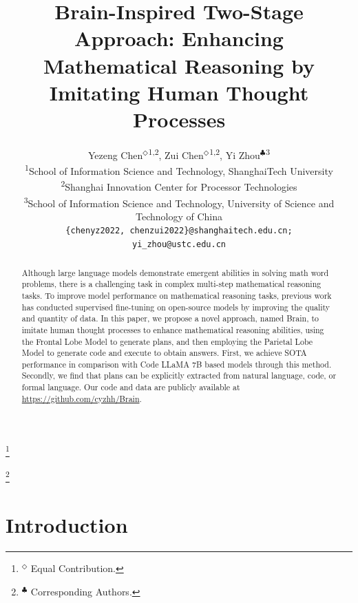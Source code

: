 \documentclass[11pt]{article}
\title{Brain-Inspired Two-Stage Approach: Enhancing Mathematical Reasoning by Imitating Human Thought Processes}
\author{
    Yezeng Chen$^\Diamond$\textsuperscript{\rm 1,\rm2}, 
    Zui Chen$^\Diamond$\textsuperscript{\rm 1,\rm2}, 
    Yi Zhou$^\clubsuit$\textsuperscript{\rm 3} \\
    \textsuperscript{\rm 1}School of Information Science and Technology, ShanghaiTech University \\
    \textsuperscript{\rm 2}Shanghai Innovation Center for Processor Technologies \\
    \textsuperscript{\rm 3}School of Information Science and Technology, University of Science and Technology of China  \\
    \texttt{\{chenyz2022, chenzui2022\}@shanghaitech.edu.cn;} \\
    \texttt{yi\_zhou@ustc.edu.cn} 
}
\newcommand\blfootnote[1]{%
  \begingroup
  \renewcommand\thefootnote{}\footnote{#1}%
  \addtocounter{footnote}{-1}%
  \endgroup
}
\begin{document}
\maketitle

\blfootnote{$^\Diamond$ Equal Contribution.}
\blfootnote{$^\clubsuit$ Corresponding Authors.}

\begin{abstract}


Although large language models demonstrate emergent abilities in solving math word problems, there is a challenging task in complex multi-step mathematical reasoning tasks. To improve model performance on mathematical reasoning tasks, previous work has conducted supervised fine-tuning on open-source models by improving the quality and quantity of data. In this paper, we propose a novel approach, named Brain, to imitate human thought processes to enhance mathematical reasoning abilities, using the Frontal Lobe Model to generate plans, and then employing the Parietal Lobe Model to generate code and execute to obtain answers. First, we achieve SOTA performance in comparison with Code LLaMA 7B based models through this method. Secondly, we find that plans can be explicitly extracted from natural language, code, or formal language. Our code and data are publicly available at \url{https://github.com/cyzhh/Brain}.

\end{abstract}

\section{Introduction}

\end{document}
